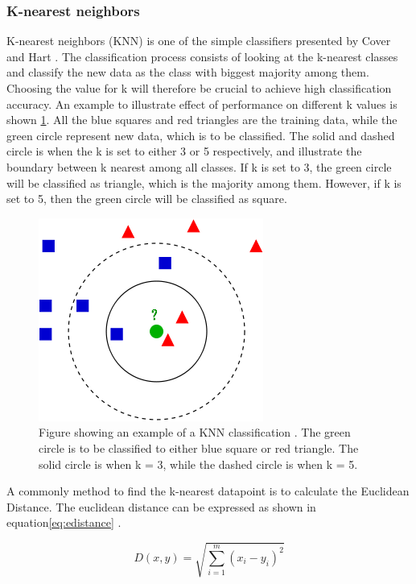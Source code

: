 \documentclass[USenglish]{ifimaster}  %
\begin{document}
\subsubsection{K-nearest neighbors}
K-nearest neighbors (KNN) is one of the simple classifiers presented by Cover and Hart \cite{1053964}. The classification process consists of looking at the k-nearest classes and classify the new data as the class with biggest majority among them. Choosing the value for k will therefore be crucial to achieve high classification accuracy. An example to illustrate effect of performance on different k values is shown \ref{fig:KNN}. All the blue squares and red triangles are the training data, while the green circle represent new data, which is to be classified. The solid and dashed circle is when the k is set to either 3 or 5 respectively, and illustrate the boundary between k nearest among all classes. If k is set to 3, the green circle will be classified as triangle, which is the majority among them. However, if k is set to 5, then the green circle will be classified as square.



\begin{figure}[h]
		\centering
		\includegraphics[scale=0.5]{Figures/KNN.png}
		\caption{Figure showing an example of a KNN classification \cite{KnnClassification}. The green circle is to be classified to either blue square or red triangle. The solid circle is when k = 3, while the dashed circle is when k = 5.}
		\label{fig:KNN}
\end{figure}
	
A commonly method to find the k-nearest datapoint is to calculate the Euclidean Distance. The euclidean distance can be expressed as shown in equation\ref{eq:edistance} \cite{Bao2004}.
	
\begin{equation}
	D(x,y)=\sqrt{\sum_{i=1}^{m}(x_{i}-y_{i})^2}
	\label{eq:edistance}
\end{equation}
\end{document}
